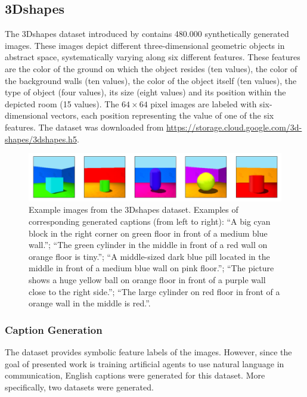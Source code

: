 \subsection{3Dshapes}
\label{ds:3dshapes}
The 3Dshapes dataset introduced by \textcite{burgess20183d} contains 480.000 synthetically generated images. These images depict different three-dimensional geometric objects in abstract space, systematically varying along six different features. These features are the color of the ground on which the object resides (ten values), the color of the background walls (ten values), the color of the object itself (ten values), the type of object (four values), its size (eight values) and its position within the depicted room (15 values). %
The $64\times64$ pixel images are labeled with six-dimensional vectors, each position representing the value of one of the six features.
The dataset was downloaded from \url{https://storage.cloud.google.com/3d-shapes/3dshapes.h5}.
\begin{figure}
\centering
\includegraphics[width=\linewidth]{images/3dshapes_example.png}
\caption{Example images from the 3Dshapes dataset. Examples of corresponding generated captions (from left to right): ``A big cyan block in the right corner on green floor in front of a medium blue wall.''; ``The green cylinder in the middle in front of a red wall on orange floor is tiny.''; ``A middle-sized dark blue pill located in the middle in front of a medium blue wall on pink floor.''; ``The picture shows a huge yellow ball on orange floor in front of a purple wall close to the right side.''; ``The large cylinder on red floor in front of a orange wall in the middle is red.''.}
\label{fig:3dshapes_example}
\end{figure}  

\subsubsection{Caption Generation}

The dataset provides symbolic feature labels of the images. However, since the goal of presented work is training artificial agents to use natural language in communication, English captions were generated for this dataset. More specifically, two datasets were generated. 

